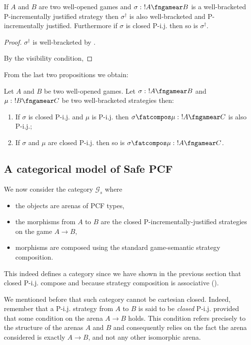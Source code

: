 \begin{proposition}
If $A$ and $B$ are two well-opened games and $\sigma :\ !A \fngamear
B$ is a well-bracketed P-incrementally justified strategy then
$\sigma^\dag$ is also well-bracketed and P-incrementally justified.
Furthermore if $\sigma$ is closed P-i.j. then so is
$\sigma^\dagger$.
\end{proposition}
\begin{proof}
$\sigma^\dag$ is well-bracketed by \cite[Proposition 2.10.]{abramsky94full}.

By the visibility condition,
\end{proof}

From the last two propositions we obtain:
\begin{corollary}
Let $A$ and $B$ be two well-opened games. Let
$\sigma :\ !A \fngamear B$ and $\mu :\ !B\fngamear C$ be two well-bracketed strategies then:
\begin{enumerate}
\item If $\sigma$ is closed P-i.j.
and $\mu$ is P-i.j. then $\sigma \fatcompos \mu :\ !A \fngamear C$ is also P-i.j.;
\item If $\sigma$ and $\mu$ are closed P-i.j. then so is $\sigma \fatcompos \mu :\ !A \fngamear C$.
\end{enumerate}
\end{corollary}

\subsection{A categorical model of Safe PCF}

We now consider the category $\mathcal{G}_s$ where
\begin{itemize}
\item the objects are arenas of PCF types,
\item the morphisms from $A$ to $B$ are the closed P-incrementally-justified strategies
on the game $A\rightarrow B$,
\item morphisms are composed using the standard game-semantic strategy composition.
\end{itemize}
This indeed defines a category since we have shown in the previous section 
that closed P-i.j. compose and because strategy composition is associative (\cite{abramsky94full, hylandong_pcf}).

We mentioned before that such category cannot be cartesian closed. Indeed, remember that
a P-i.j. strategy from $A$ to $B$ is said to be \emph{closed} P-i.j. provided that some condition
on the arena $A\rightarrow B$ holds. This condition refers precisely to the structure of the arenas $A$ and $B$ and consequently relies on the fact the arena considered is exactly $A\rightarrow B$, and not any other isomorphic arena.




